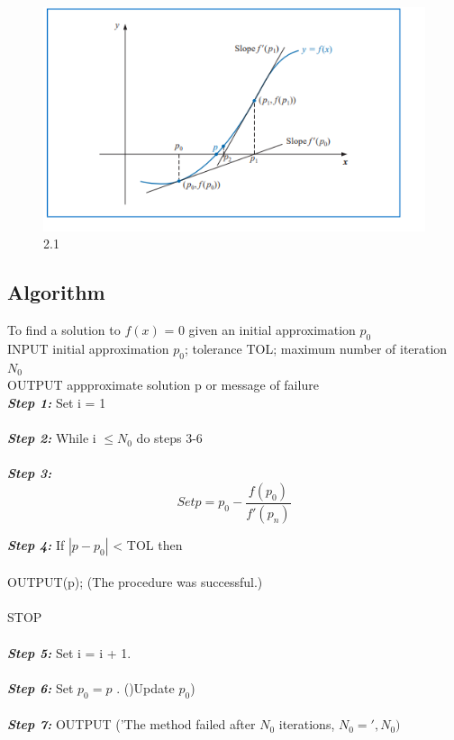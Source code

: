 \documentclass[12pt,a4paper]{article}
\begin{document}
	\begin{figure}[h]
		\centering
		\includegraphics[width=1\textwidth]{Nr_fig_0.png} %
		\caption{2.1}
		
	\end{figure}
	\newpage
	\subsection{Algorithm} 
	To find a solution to \(f(x)\) = 0 given an initial approximation $p_{0}$ \\
	INPUT initial approximation $p_{0}$; tolerance TOL; maximum number of iteration $N_{0}$ \\
	OUTPUT appproximate solution p or message of failure \\
	
	\textbf{\textit{Step 1:}} Set i = 1\\ \\
	\textbf{\textit{Step 2:}}	While i $\leq N_{0}$ do steps 3-6 \\ \\
	\textbf{\textit{Step 3:}} 
	\[
	Set p = p_0 - \frac{f(p_0)}{f'(p_n)}
	\]  
	
	
	\textbf{\textit{Step 4:}} If $|p - p_{0}|$ < TOL then \\\\
	OUTPUT(p); (The procedure was successful.)\\ \\
	STOP \\\\
	\textbf{\textit{Step 5:}} Set i = i + 1. \\ \\
	\textbf{\textit{Step 6:}} Set $p_{0}=p$ . ()Update $p_{0}$) \\ \\
	\textbf{\textit{Step 7:}} OUTPUT ('The method failed after $N_{0}$ iterations, $N_{0}=',N_{0})$ 
	
\end{document}
